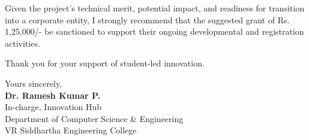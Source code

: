 \documentclass[12pt,a4paper]{article}
\begin{document}
Given the project's technical merit, potential impact, and readiness for transition into a corporate entity, I strongly recommend that the suggested grant of Rs. 1,25,000/- be sanctioned to support their ongoing developmental and registration activities.

Thank you for your support of student-led innovation.

\vspace{1.5em}

\begin{flushleft}
    Yours sincerely, \\
    \vspace{3em}
    \textbf{Dr. Ramesh Kumar P.} \\
    In-charge, Innovation Hub \\
    Department of Computer Science \& Engineering \\
    VR Siddhartha Engineering College
\end{flushleft}
\end{document}
